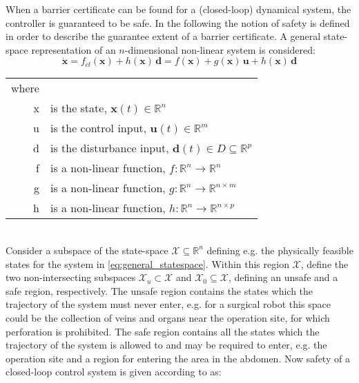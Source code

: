 When a barrier certificate can be found for a (closed-loop) dynamical system, the controller is guaranteed to be safe. In the following the notion of safety is defined in order to describe the guarantee extent of a barrier certificate. A general state-space representation of an $n$-dimensional non-linear system is considered:
\begin{equation}
\dot{\mathbf{x}} = f_{cl}(\mathbf{x}) + h(\mathbf{x})\,\mathbf{d} = f(\mathbf{x}) + g(\mathbf{x})\,\mathbf{u} + h(\mathbf{x})\,\mathbf{d}
\label{eq:general_statespace}
\end{equation}
\begin{tabular}{rl} 
where &  \\
\gls{x} &  is the state, $\mathbf{x}(t) \in \mathbb{R}^n$\\
\gls{u} & is the control input, $\mathbf{u}(t) \in \mathbb{R}^m$\\
\gls{d} & is the disturbance input, $\mathbf{d}(t) \in D \subseteq \mathbb{R}^p$ \\
\gls{f} & is a non-linear function, $f:\mathbb{R}^n \rightarrow \mathbb{R}^n$\\
\gls{g} & is a non-linear function, $g:\mathbb{R}^n \rightarrow \mathbb{R}^{n \times m}$\\
\gls{h} & is a non-linear function, $h:\mathbb{R}^n \rightarrow \mathbb{R}^{n \times p}$
\end{tabular}\\

Consider a subspace of the state-space $\mathcal{X}\subseteq\mathbb{R}^n$ defining e.g. the physically feasible states for the system in \autoref{eq:general_statespace}. Within this region $\mathcal{X}$, define the two non-intersecting subspaces $\mathcal{X}_u\subset\mathcal{X}$ and $\mathcal{X}_0\subseteq\mathcal{X}$, defining an unsafe  and a safe region, respectively. The unsafe region contains the states which the trajectory of the system must never enter, e.g. for a surgical robot this space could be the collection of veins and organs near the operation site, for which perforation is prohibited. The safe region contains all the states which the trajectory of the system is allowed to and may be required to enter, e.g. the operation site and a region for entering the area in the abdomen.
Now safety of a closed-loop control system is given according to \citep{bib:safety,bib:prajna_framework} as:

